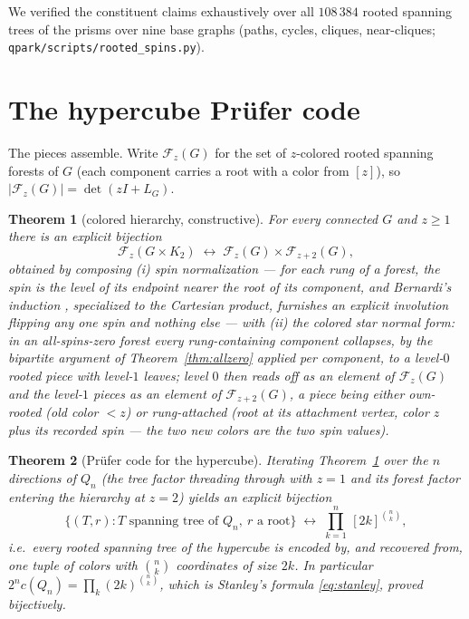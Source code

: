 \documentclass[11pt]{amsart}
\newtheorem{theorem}{Theorem}[section]
\theoremstyle{definition}
\begin{document}
We verified the constituent claims exhaustively over all $108\,384$ rooted
spanning trees of the prisms over nine base graphs (paths, cycles, cliques,
near-cliques; \texttt{qpark/scripts/rooted\_spins.py}).

\section{The hypercube Pr\"ufer code}\label{sec:prufer}

The pieces assemble. Write $\mathcal{F}_z(G)$ for the set of $z$-colored
rooted spanning forests of $G$ (each component carries a root with a color
from $[z]$), so $|\mathcal{F}_z(G)| = \det(zI + L_G)$.

\begin{theorem}[colored hierarchy, constructive]\label{thm:colored}
For every connected $G$ and $z \ge 1$ there is an explicit bijection
\[
  \mathcal{F}_z(G\times K_2) \;\longleftrightarrow\;
  \mathcal{F}_z(G) \times \mathcal{F}_{z+2}(G),
\]
obtained by composing (i) spin normalization --- for each rung of a forest,
the spin is the level of its endpoint nearer the root of its component, and
Bernardi's induction \cite[proof of Thm.~1]{bernardi}, specialized to the
Cartesian product, furnishes an explicit involution flipping any one spin
and nothing else --- with (ii) the colored star normal form: in an
all-spins-zero forest every rung-containing component collapses, by the
bipartite argument of Theorem~\ref{thm:allzero} applied per component, to a
level-$0$ rooted piece with level-$1$ leaves; level $0$ then reads off as an
element of $\mathcal{F}_z(G)$ and the level-$1$ pieces as an element of
$\mathcal{F}_{z+2}(G)$, a piece being either own-rooted (old color $< z$)
or rung-attached (root at its attachment vertex, color $z$ plus its
recorded spin --- the two new colors are the two spin values).
\end{theorem}

\begin{theorem}[Pr\"ufer code for the hypercube]\label{thm:prufer}
Iterating Theorem~\ref{thm:colored} over the $n$ directions of $Q_n$
(the tree factor threading through with $z=1$ and its forest factor
entering the hierarchy at $z=2$) yields an explicit bijection
\[
  \{(T, r) : T \text{ spanning tree of } Q_n,\ r \text{ a root}\}
  \;\longleftrightarrow\;
  \prod_{k=1}^{n} \,[2k]^{\binom nk},
\]
i.e.\ every rooted spanning tree of the hypercube is encoded by, and
recovered from, one tuple of colors with $\binom nk$ coordinates of size
$2k$. In particular $2^n c(Q_n) = \prod_k (2k)^{\binom nk}$, which is
Stanley's formula \eqref{eq:stanley}, proved bijectively.
\end{theorem}
\end{document}
